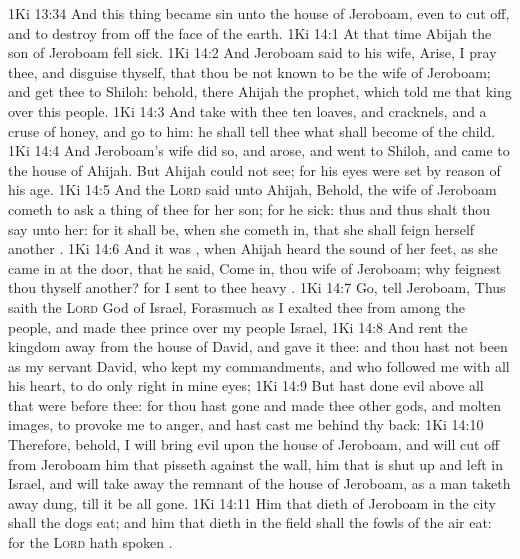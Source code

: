\vs 1Ki 13:34 And this thing became sin unto the house of Jeroboam, even to cut  off, and to destroy  from off the face of the earth.
\vs 1Ki 14:1 At that time Abijah the son of Jeroboam fell sick.
\vs 1Ki 14:2 And Jeroboam said to his wife, Arise, I pray thee, and disguise thyself, that thou be not known to be the wife of Jeroboam; and get thee to Shiloh: behold, there  Ahijah the prophet, which told me that  king over this people.
\vs 1Ki 14:3 And take with thee ten loaves, and cracknels, and a cruse of honey, and go to him: he shall tell thee what shall become of the child.
\vs 1Ki 14:4 And Jeroboam's wife did so, and arose, and went to Shiloh, and came to the house of Ahijah. But Ahijah could not see; for his eyes were set by reason of his age.
\vs 1Ki 14:5 And the \textsc{Lord} said unto Ahijah, Behold, the wife of Jeroboam cometh to ask a thing of thee for her son; for he  sick: thus and thus shalt thou say unto her: for it shall be, when she cometh in, that she shall feign herself  another .
\vs 1Ki 14:6 And it was , when Ahijah heard the sound of her feet, as she came in at the door, that he said, Come in, thou wife of Jeroboam; why feignest thou thyself  another? for I  sent to thee  heavy .
\vs 1Ki 14:7 Go, tell Jeroboam, Thus saith the \textsc{Lord} God of Israel, Forasmuch as I exalted thee from among the people, and made thee prince over my people Israel,
\vs 1Ki 14:8 And rent the kingdom away from the house of David, and gave it thee: and  thou hast not been as my servant David, who kept my commandments, and who followed me with all his heart, to do  only  right in mine eyes;
\vs 1Ki 14:9 But hast done evil above all that were before thee: for thou hast gone and made thee other gods, and molten images, to provoke me to anger, and hast cast me behind thy back:
\vs 1Ki 14:10 Therefore, behold, I will bring evil upon the house of Jeroboam, and will cut off from Jeroboam him that pisseth against the wall,  him that is shut up and left in Israel, and will take away the remnant of the house of Jeroboam, as a man taketh away dung, till it be all gone.
\vs 1Ki 14:11 Him that dieth of Jeroboam in the city shall the dogs eat; and him that dieth in the field shall the fowls of the air eat: for the \textsc{Lord} hath spoken .
